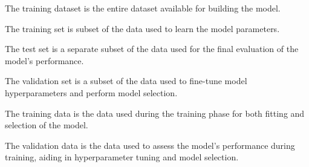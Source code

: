 \begin{definition} 
    The training dataset is the entire dataset available for building the model. 
\end{definition}
\begin{definition} 
    The training set is subset of the data used to learn the model parameters. 
\end{definition}
\begin{definition} 
    The test set is a separate subset of the data used for the final evaluation of the model's performance. 
\end{definition}
\begin{definition} 
    The validation set is a subset of the data used to fine-tune model hyperparameters and perform model selection.
\end{definition}
\begin{definition} 
    The training data is the data used during the training phase for both fitting and selection of the model. 
\end{definition}
\begin{definition}
    The validation data is the data used to assess the model's performance during training, aiding in hyperparameter tuning and model selection. 
\end{definition}

